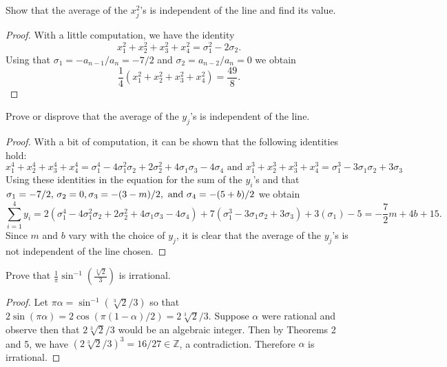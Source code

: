 \documentclass[10pt]{amsart}
\begin{document}
\begin{thm}
	Show that the average of the $x_j^2$'s is independent of the line and find its value.
	\begin{proof}
	With a little computation, we have the identity $$x_1^2 + x_2^2 + x_3^2 + x_4^2 = \sigma_1^2 - 2\sigma_2.$$
	Using that $\sigma_1 = -a_{n-1}/a_n = -7/2$ and $\sigma_2 = a_{n-2}/a_n = 0$ we obtain $$\frac{1}{4}(x_1^2 + x_2^2 + x_3^2 + x_4^2) = \frac{49}{8}.$$
	\end{proof}
\end{thm}

\begin{thm}
	Prove or disprove that the average of the $y_j$'s is independent of the line.
	\begin{proof}
	With a bit of computation, it can be shown that the following identities hold:
		$$x_1^4 + x_2^4 + x_3^4 + x_4^4 = \sigma_{1}^{4} - 4 \sigma_{1}^{2} \sigma_{2} + 2 \sigma_{2}^{2} + 4
\sigma_{1} \sigma_{3} - 4 \sigma_{4} \text{ and }
		x_1^3 + x_2^3 + x_3^3 + x_4^3 = \sigma_{1}^{3} - 3 \sigma_{1} \sigma_{2} + 3 \sigma_{3}$$
	Using these identities in the equation for the sum of the $y_i$'s and that $\sigma_1 = -7/2,\, \sigma_2 = 0,\\ \sigma_3 = -(3-m)/2, \text{ and } \sigma_4 = -(5 + b)/2$ we obtain
	$$\sum_{i=1}^4 y_i= 2(\sigma_{1}^{4} - 4 \sigma_{1}^{2} \sigma_{2} + 2 \sigma_{2}^{2} + 4
\sigma_{1} \sigma_{3} - 4 \sigma_{4}) + 7(\sigma_{1}^{3} - 3 \sigma_{1} \sigma_{2} + 3 \sigma_{3}) + 3(\sigma_1) - 5 = -\frac{7}{2} m + 4 b + 15.$$
	Since $m$ and $b$ vary with the choice of $y_j$, it is clear that the average of the $y_j$'s is not independent of the line chosen.

	\end{proof}
\end{thm}

\begin{thm}
	Prove that $\displaystyle{\frac{1}{\pi}\sin^{-1}\left(\frac{\sqrt[3]{2}}{3}\right)}$ is irrational.
	\begin{proof}
	Let $\pi\alpha = \sin^{-1}(\sqrt[3]{2}/3)$ so that $2\sin(\pi\alpha) = 2\cos(\pi(1-\alpha)/2) = 2\sqrt[3]{2}/3$.
	Suppose $\alpha$ were rational and observe then that $2\sqrt[3]{2}/3$ would be an algebraic integer.
	Then by Theorems 2 and 5, we have $(2\sqrt[3]{2}/3)^3 = 16/27 \in \mathbb{Z}$, a contradiction.
	Therefore $\alpha$ is irrational.
	
	\end{proof}
\end{thm}
\end{document}
